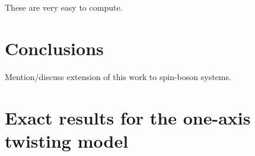 \documentclass[pra,reprint,longbibliography]{revtex4-1}
\newcommand{\1}{\mathds{1}}
\begin{document}
These are very easy to compute.








\section{Conclusions}

Mention/discuss extension of this work to spin-boson systems.


\newpage
\onecolumngrid
\appendix

\section{Exact results for the one-axis twisting model}
\label{sec:OAT}
\end{document}
